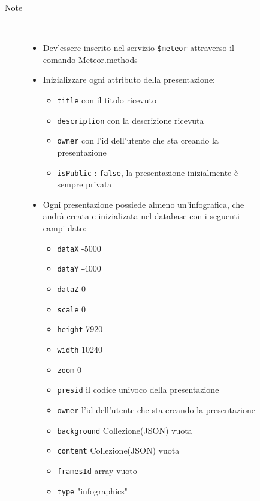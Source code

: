 \begin{description}
\begin{description}
\begin{description}
\begin{itemize}
				\end{itemize}
			\item[Note] \hfill \\
			\begin{itemize}
					\item Dev'essere inserito nel servizio \texttt{\$meteor} attraverso il comando Meteor.methods
					\item Inizializzare ogni attributo della presentazione:
					\begin{itemize}
					\item \texttt{title} con il titolo ricevuto
					\item \texttt{description} con la descrizione ricevuta
					\item \texttt{owner} con l'id dell'utente che sta creando la presentazione
					\item \texttt{isPublic} : \texttt{false}, la presentazione inizialmente è sempre privata
					\end{itemize}
					\item Ogni presentazione possiede almeno un'infografica, che andrà creata e inizializata nel database con i seguenti campi dato:
					\begin{itemize}
					\item \texttt{dataX} -5000
					\item \texttt{dataY} -4000
					\item \texttt{dataZ} 0
					\item \texttt{scale} 0
					\item \texttt{height} 7920
					\item \texttt{width} 10240
					\item \texttt{zoom} 0
					\item \texttt{presid} il codice univoco della presentazione
					\item \texttt{owner} l'id dell'utente che sta creando la presentazione
					\item \texttt{background} Collezione(JSON) vuota
					\item \texttt{content} Collezione(JSON) vuota
					\item \texttt{framesId} array vuoto
					\item \texttt{type} "infographics"
					\end{itemize}
				\end{itemize}
		\end{description}
	\end{description}


\end{description}
